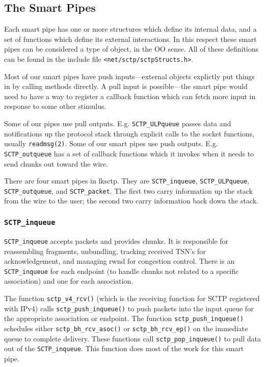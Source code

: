 \documentclass[twocolumn]{article}
\begin{document}
\subsection{The Smart Pipes}

Each smart pipe has one or more structures which define its internal
data, and a set of functions which define its external interactions.
In this respect these smart pipes can be considered a type of object,
in the OO sense.  All of these definitions can be found in the include 
file \texttt{<net/sctp/sctpStructs.h>}.

Most of our smart pipes have push inputs---external objects explictly
put things in by calling methods directly.  A pull input is
possible---the smart pipe would need to have a way to register a
callback function which can fetch more input in response to some other 
stimulus.

Some of our pipes use pull outputs.  E.g. \texttt{SCTP\_ULPqueue} passes
data and notifications up the protocol stack through explicit calls to
the socket functions, usually \texttt{readmsg(2)}.  Some of our smart
pipes use push outputs.  E.g. \texttt{SCTP\_outqueue} has a set of
callback functions which it invokes when it needs to send chunks out
toward the wire.

There are four smart pipes in lksctp.  They are
\texttt{SCTP\_inqueue}, \texttt{SCTP\_ULPqueue},
\texttt{SCTP\_outqueue}, and \texttt{SCTP\_packet}.  The first two
carry information up the stack from the wire to the user; the second
two carry information back down the stack. 

\subsubsection{\texttt{SCTP\_inqueue}}

\texttt{SCTP\_inqueue} accepts packets and provides chunks.  It is
responsible for reassembling fragments, unbundling, tracking received
TSN's for acknowledgement, and managing rwnd for congestion control.
There is an \texttt{SCTP\_inqueue} for each endpoint (to handle chunks
not related to a specific association) and one for each association.

The function \texttt{sctp\_v4\_rcv()} (which is the receiving function
for SCTP registered with IPv4) calls \texttt{sctp\_push\_inqueue()} to
push packets into the input queue for the appropriate association or
endpoint.  The function \texttt{sctp\_push\_inqueue()} schedules
either \texttt{sctp\_bh\_rcv\_asoc()} or \texttt{sctp\_bh\_rcv\_ep()}
on the immediate queue to complete delivery.  These functions call
\texttt{sctp\_pop\_inqueue()} to pull data out of the
\texttt{SCTP\_inqueue}.  This function does most of the work for this
smart pipe.
\end{document}
